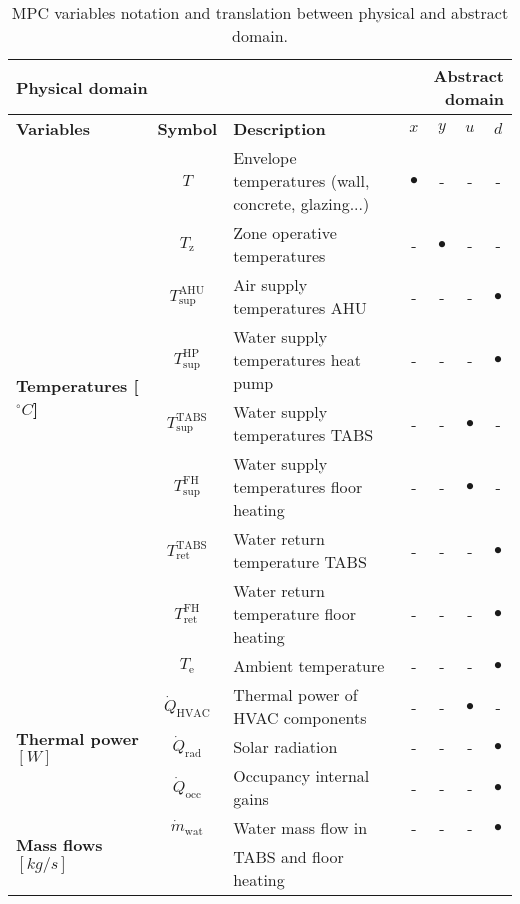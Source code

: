 \documentclass[10pt]{extarticle}
\begin{document}
\begin{table}[ht]
	\centering
	\caption{MPC variables notation and translation between physical and abstract domain. }
	\label{tab:mpc_form:translation}
	\begin{tabular}{l|c|l|cccc}
		\toprule
		\multicolumn{3}{l}{\textbf{Physical domain}} &  \multicolumn{4}{r}{\textbf{Abstract domain}} \\
		\toprule
		\textbf{Variables} & \textbf{Symbol} & \textbf{Description} & \textbf{$x$} & \textbf{$y$} & \textbf{$u$} & \textbf{$d$}  \\ 
		\midrule
		\multirow{8}{*}{\textbf{Temperatures [$^\circ C$]}} & $T$ & Envelope temperatures (wall, concrete, glazing...) & $\bullet$ & -  & - & - \\ 
		& $T_{\text{z}}$ & Zone operative temperatures  & - & $\bullet$ & -  & - \\
		& $T^{\text{AHU}}_{\text{sup}}$ & Air supply temperatures AHU &  - & - & - & $\bullet$ \\
		& $T^{\text{HP}}_{\text{sup}}$ & Water supply temperatures heat pump&  - & - & - & $\bullet$ \\
		& $T^{\text{TABS}}_{\text{sup}}$ & Water supply temperatures TABS&  - & - & $\bullet$ & -  \\
		& $T^{\text{FH}}_{\text{sup}}$ & Water supply temperatures floor heating&  - & - & $\bullet$ & -  \\
		& $T^{\text{TABS}}_{\text{ret}}$ & Water return temperature TABS &  - & - & - & $\bullet$ \\
		& $T^{\text{FH}}_{\text{ret}}$ & Water return temperature floor heating &  - & - & - & $\bullet$  \\
		& $T_\text{e}$ & Ambient temperature &  - & - & - & $\bullet$ \\
		\midrule
		\multirow{3}{*}{\textbf{Thermal power $[W]$}} 
		& $\dot{Q}_{\text{HVAC}}$ & Thermal power of  HVAC components  & - & - &  $\bullet$ &- \\
		& $\dot{Q}_{\text{rad}}$ & Solar radiation & - & - & - & $\bullet$  \\
		& $\dot{Q}_{\text{occ}}$ & Occupancy internal gains & - & - & - & $\bullet$  \\
\midrule
		\multirow{2}{*}{\textbf{Mass flows $[kg/s]$}} &
		$\dot{m}_{\text{wat}}$ & Water mass flow in & - & - & - & $\bullet$ \\
		&  & TABS and floor heating  & &  &  \\

\end{tabular}
\end{table}
\end{document}
